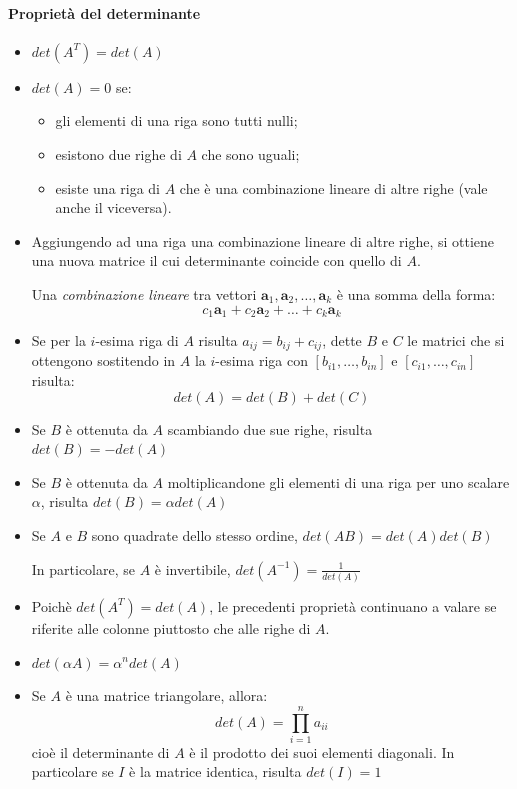 \documentclass[12pt]{report}
\begin{document}
\paragraph{Proprietà del determinante}
\begin{itemize}
	\item $det(A^T) = det(A)$
	\item $det(A) = 0$ se:
	\begin{itemize}
		\item gli elementi di una riga sono tutti nulli;
		\item esistono due righe di $A$ che sono uguali;
		\item esiste una riga di $A$ che è una combinazione lineare di altre righe (vale anche il viceversa).
	\end{itemize}
	\item Aggiungendo ad una riga una combinazione lineare di altre righe, si ottiene una nuova matrice il cui determinante coincide con quello di $A$.
	\begin{note}{}{}
	Una \textit{combinazione lineare} tra vettori $\mathbf{a}_1, \mathbf{a}_2, \dots, \mathbf{a}_k$ è una somma della forma:
	\[
	c_1\mathbf{a}_1 + c_2\mathbf{a}_2 + \dots + c_k\mathbf{a}_k
	\]
	\end{note}
	\item Se per la $i$-esima riga di $A$ risulta $a_{ij} = b_{ij} + c_{ij}$, dette $B$ e $C$ le matrici che si ottengono sostitendo in $A$ la $i$-esima riga con $[b_{i1}, \dots, b_{in}]$ e $[c_{i1}, \dots, c_{in}]$ risulta:
	\[
	det(A) = det(B) + det(C)
	\]
\item Se $B$ è ottenuta da $A$ scambiando due sue righe, risulta $det(B) = -det(A)$
\item Se $B$ è ottenuta da $A$ moltiplicandone gli elementi di una riga per uno scalare $\alpha$, risulta $det(B) = \alpha det(A)$
\item Se $A$ e $B$ sono quadrate dello stesso ordine, $det(AB) = det(A)det(B)$

In particolare, se $A$ è invertibile, $det(A^{-1}) = \displaystyle\frac{1}{det(A)}$
\item Poichè $det(A^T) = det(A)$, le precedenti proprietà continuano a valare se riferite alle colonne piuttosto che alle righe di $A$.
\item $det(\alpha A) = \alpha^n det(A)$
\item Se $A$ è una matrice triangolare, allora:
\[
det(A) = \prod_{i=1}^{n}a_{ii}
\]
cioè il determinante di $A$ è il prodotto dei suoi elementi diagonali. In particolare se $I$ è la matrice identica, risulta $det(I) = 1$
\end{itemize}
\end{document}
